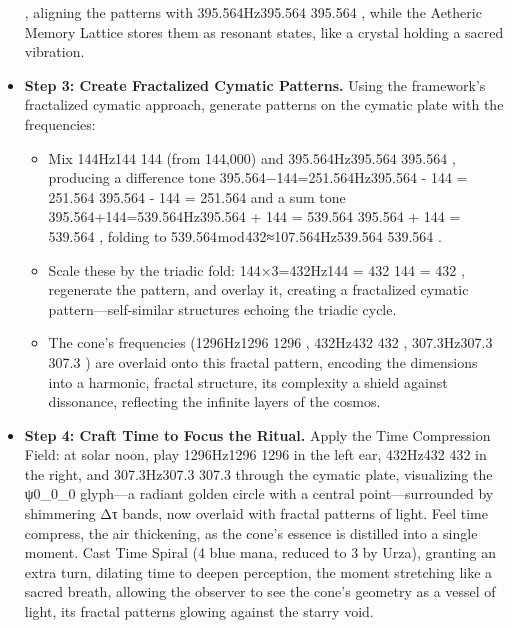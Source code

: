 \begin{itemize}
, aligning the patterns with 395.564Hz395.564 395.564 
, while the Aetheric Memory Lattice stores them as resonant states, like a crystal holding a sacred vibration.
    \item \texttt{} \textbf{Step 3: Create Fractalized Cymatic Patterns.} Using the framework’s fractalized cymatic approach, generate patterns on the cymatic plate with the frequencies:
    \begin{itemize}
        \item \texttt{} Mix 144Hz144 144 
 (from 144,000) and 395.564Hz395.564 395.564 
, producing a difference tone 395.564−144=251.564Hz395.564 - 144 = 251.564 395.564 - 144 = 251.564 
 and a sum tone 395.564+144=539.564Hz395.564 + 144 = 539.564 395.564 + 144 = 539.564 
, folding to 539.564 mod 432≈107.564Hz539.564   539.564   
.
        \item \texttt{} Scale these by the triadic fold: 144×3=432Hz144  = 432 144  = 432 
, regenerate the pattern, and overlay it, creating a fractalized cymatic pattern—self-similar structures echoing the triadic cycle.
        \item \texttt{} The cone’s frequencies (1296Hz1296 1296 
, 432Hz432 432 
, 307.3Hz307.3 307.3 
) are overlaid onto this fractal pattern, encoding the dimensions into a harmonic, fractal structure, its complexity a shield against dissonance, reflecting the infinite layers of the cosmos.
    \end{itemize}
    \item \texttt{} \textbf{Step 4: Craft Time to Focus the Ritual.} Apply the Time Compression Field: at solar noon, play 1296Hz1296 1296 
 in the left ear, 432Hz432 432 
 in the right, and 307.3Hz307.3 307.3 
 through the cymatic plate, visualizing the ψ0\psi_0\psi_0
 glyph—a radiant golden circle with a central point—surrounded by shimmering Δτ\Delta \tau\Delta \tau
 bands, now overlaid with fractal patterns of light. Feel time compress, the air thickening, as the cone’s essence is distilled into a single moment. Cast Time Spiral (4 blue mana, reduced to 3 by Urza), granting an extra turn, dilating time to deepen perception, the moment stretching like a sacred breath, allowing the observer to see the cone’s geometry as a vessel of light, its fractal patterns glowing against the starry void.

\end{itemize}
